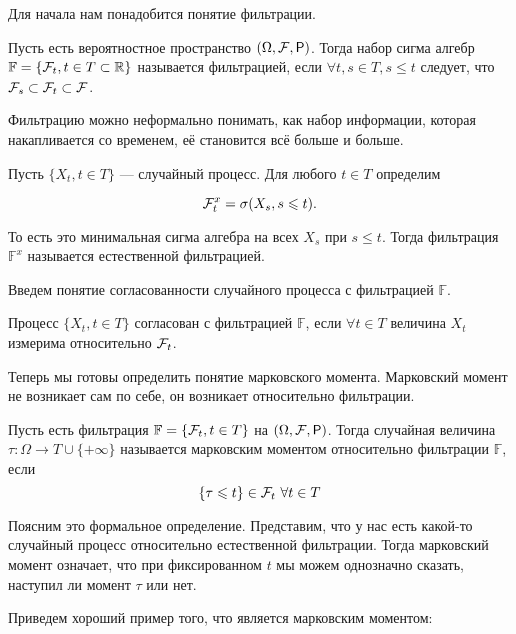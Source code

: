 Для начала нам понадобится понятие фильтрации.

\begin{definition}
  Пусть есть вероятностное пространство $(\Omega, \F, \Pr)$. Тогда набор
  сигма алгебр $\mathbb{F} = \{\mathcal{F}_t, t \in T \subset \mathbb{R}\}$ называется фильтрацией,
  если $\forall t, s \in T, s \leq t$ следует, что $\mathcal{F}_s \subset \mathcal{F}_t \subset \mathcal{F}$.
\end{definition}

Фильтрацию можно неформально понимать, как набор информации, которая накапливается
со временем, её становится всё больше и больше.

\begin{definition}
  Пусть $\{X_t, t \in T\}$ --- случайный процесс. Для любого $t \in T$ определим

  \[
    \mathcal{F}_t^x = \sigma(X_s, s \leqslant t).
  \]

  То есть это минимальная сигма алгебра на всех $X_s$ при  $s \leq t$. Тогда
  фильтрация $\mathbb{F}^x$ называется естественной фильтрацией.
\end{definition}

Введем понятие согласованности случайного процесса с фильтрацией $\mathbb{F}$.

\begin{definition}
  Процесс $\{X_t, t \in T\}$ согласован с фильтрацией $\mathbb{F}$, если
  $\forall t \in T$ величина $X_t$ измерима относительно $\mathcal{F}_t$.
\end{definition}

Теперь мы готовы определить понятие марковского момента. Марковский момент
не возникает сам по себе, он возникает относительно фильтрации.

\begin{definition}
  Пусть есть фильтрация $\mathbb{F} = \{\mathcal{F}_t, t \in T\}$ на $(\Omega, \F, \Pr)$.
  Тогда случайная величина $\tau : \Omega \to T \cup \{+\infty\}$ называется марковским моментом
  относительно фильтрации $\mathbb{F}$, если
  \[
    \{\tau \leqslant t\} \in \mathcal{F}_t \ \forall t \in T
  \]
\end{definition}

Поясним это формальное определение. Представим, что у нас есть какой-то случайный
процесс относительно естественной фильтрации. Тогда марковский момент означает,
что при фиксированном $t$ мы можем однозначно сказать, наступил ли момент $\tau$
или нет.

Приведем хороший пример того, что является марковским моментом:

